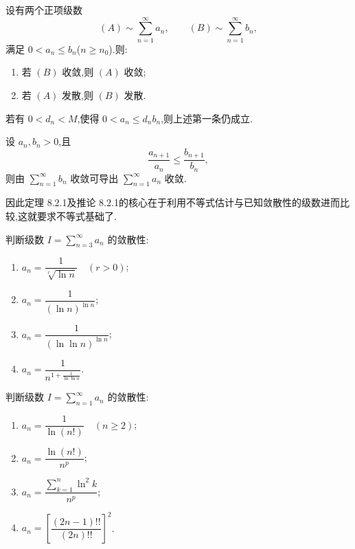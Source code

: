 \documentclass[../../数学分析培优讲义.tex]{subfiles}
\begin{document}

\begin{theorem}[\marktwostar]
设有两个正项级数
\[
    (A)\sim\sum\limits_{n=1}^{\infty}a_n,
    \qquad
    (B)\sim\sum\limits_{n=1}^{\infty}b_n,
\]
满足 $0<a_n\leq b_n$($n\geq n_0$).则:
\begin{enumerate}[label=(\arabic*)]
    \item 若 $(B)$ 收敛,则 $(A)$ 收敛;
    \item 若 $(A)$ 发散,则 $(B)$ 发散.
\end{enumerate}
\end{theorem}

\begin{remark}
若有 $0<d_n<M$,使得 $0<a_n\leq d_nb_n$,则上述第一条仍成立.
\end{remark}

\begin{corollary}[\marktwostar]
设 $a_n,b_n>0$,且
\[
    \dfrac{a_{n+1}}{a_n}\leq\dfrac{b_{n+1}}{b_n},
\]
则由 $\displaystyle\sum\limits_{n=1}^{\infty}b_n$ 收敛可导出 $\displaystyle\sum\limits_{n=1}^{\infty}a_n$ 收敛.
\end{corollary}

\begin{remark}
因此定理 8.2.1及推论 8.2.1的核心在于利用不等式估计与已知敛散性的级数进而比较,这就要求不等式基础了.
\end{remark}

\begin{example}
判断级数 $\displaystyle I=\sum\limits_{n=3}^{\infty}a_n$ 的敛散性:
\begin{enumerate}[label=(\arabic*)]
    \item $\displaystyle a_n=\dfrac{1}{\sqrt[r]{\ln n}}\quad(r>0)$;
    \item $\displaystyle a_n=\dfrac{1}{(\ln n)^{\ln n}}$;
    \item $\displaystyle a_n=\dfrac{1}{(\ln\ln n)^{\ln n}}$;
    \item $\displaystyle a_n=\dfrac{1}{n^{1+\frac{1}{\ln\ln n}}}$.
\end{enumerate}
\end{example}
\exampleblank

\begin{example}
判断级数 $\displaystyle I=\sum\limits_{n=1}^{\infty}a_n$ 的敛散性:
\begin{enumerate}[label=(\arabic*)]
    \item $\displaystyle a_n=\dfrac{1}{\ln(n!)}\quad(n\geq2)$;
    \item $\displaystyle a_n=\dfrac{\ln(n!)}{n^p}$;
    \item $\displaystyle a_n=\dfrac{\sum\limits_{k=1}^n\ln^2k}{n^p}$;
    \item $\displaystyle a_n=\left[\dfrac{(2n-1)!!}{(2n)!!}\right]^2$.
\end{enumerate}
\end{example}
\exampleblank
\end{document}
